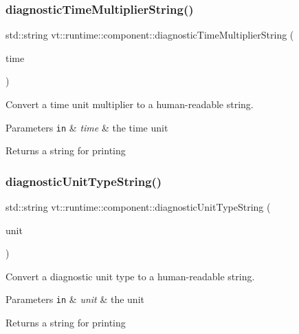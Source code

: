\subsubsection{\texorpdfstring{diagnostic\+Time\+Multiplier\+String()}{diagnosticTimeMultiplierString()}}
{\footnotesize\ttfamily std\+::string vt\+::runtime\+::component\+::diagnostic\+Time\+Multiplier\+String (\begin{DoxyParamCaption}\item[{\hyperlink{namespacevt_1_1runtime_1_1component_a7c43622f1c2cc49bc223523837649b1a}{Time\+Multiplier}}]{time }\end{DoxyParamCaption})}



Convert a time unit multiplier to a human-\/readable string. 


\begin{DoxyParams}[1]{Parameters}
\mbox{\tt in}  & {\em time} & the time unit\\
\hline
\end{DoxyParams}
\begin{DoxyReturn}{Returns}
a string for printing 
\end{DoxyReturn}
\mbox{\label{namespacevt_1_1runtime_1_1component_ad4ad0d77bfcfe9f714950cb8ccc5f93a}} 
\subsubsection{\texorpdfstring{diagnostic\+Unit\+Type\+String()}{diagnosticUnitTypeString()}}
{\footnotesize\ttfamily std\+::string vt\+::runtime\+::component\+::diagnostic\+Unit\+Type\+String (\begin{DoxyParamCaption}\item[{\hyperlink{namespacevt_1_1runtime_1_1component_a99ec18b08862c712176126bb7d0e307a}{Diagnostic\+Unit}}]{unit }\end{DoxyParamCaption})}



Convert a diagnostic unit type to a human-\/readable string. 


\begin{DoxyParams}[1]{Parameters}
\mbox{\tt in}  & {\em unit} & the unit\\
\hline
\end{DoxyParams}
\begin{DoxyReturn}{Returns}
a string for printing 
\end{DoxyReturn}
\mbox{\label{namespacevt_1_1runtime_1_1component_ac34e12698b9c3d80f4697368a28b763b}} 
